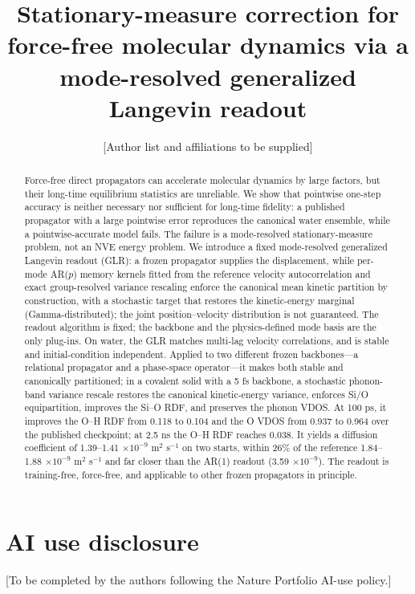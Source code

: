 \documentclass[11pt]{article}
\title{Stationary-measure correction for force-free molecular dynamics via a
mode-resolved generalized Langevin readout}
\author{[Author list and affiliations to be supplied]}
\date{}
\begin{document}
\maketitle

\begin{abstract}
Force-free direct propagators can accelerate molecular dynamics by large factors, but their
long-time equilibrium statistics are unreliable. We show that pointwise one-step accuracy is
neither necessary nor sufficient for long-time fidelity: a published propagator with a large
pointwise error reproduces the canonical water ensemble, while a pointwise-accurate model fails.
The failure is a mode-resolved stationary-measure problem, not an NVE energy problem. We
introduce a fixed mode-resolved generalized Langevin readout (GLR): a frozen propagator supplies
the displacement, while per-mode AR($p$) memory kernels fitted from the reference velocity
autocorrelation and exact group-resolved variance rescaling enforce the canonical mean kinetic
partition by construction, with a stochastic target that restores the kinetic-energy marginal
(Gamma-distributed); the joint position--velocity distribution is not guaranteed. The
readout algorithm is fixed; the backbone and the physics-defined mode basis are the only plug-ins.
On water, the GLR matches multi-lag velocity
correlations, and is stable and initial-condition independent. Applied to two different frozen
backbones---a relational propagator and a phase-space operator---it makes both stable and
canonically partitioned; in a covalent solid with a 5 fs backbone, a stochastic phonon-band
variance rescale restores the canonical kinetic-energy variance, enforces Si/O equipartition,
improves the Si--O RDF, and preserves the phonon VDOS. At
100 ps, it improves the
O--H RDF from 0.118 to 0.104 and the O VDOS from 0.937 to 0.964 over the published checkpoint; at
2.5 ns the O--H RDF reaches 0.038. It yields a diffusion coefficient of
1.39--1.41 $\times 10^{-9}$ m$^2$ s$^{-1}$ on two starts,
within 26\% of the reference 1.84--1.88 $\times 10^{-9}$ m$^2$ s$^{-1}$ and far closer than the
AR(1) readout (3.59 $\times 10^{-9}$). The readout is training-free, force-free, and applicable
to other frozen propagators in principle.
\end{abstract}






\section*{AI use disclosure}
[To be completed by the authors following the Nature Portfolio AI-use policy.]



\end{document}
